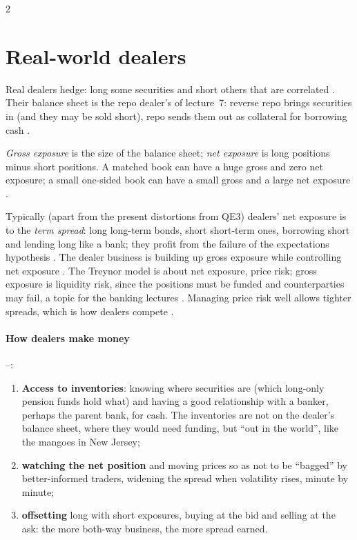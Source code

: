 \begin{paracol}{2}
\section{Real-world dealers}\label{sec:dl-real}

Real dealers hedge: long some securities and short others that are correlated . Their balance sheet is the repo dealer's of lecture~7: reverse repo brings securities in (and
they may be sold short), repo sends them out as collateral for borrowing cash .

\begin{definition}
\emph{Gross exposure} is the size of the balance sheet; \emph{net exposure} is long positions minus short positions. A matched book can have a huge gross and zero net exposure; a small
one-sided book can have a small gross and a large net exposure .
\end{definition}

Typically (apart from the present distortions from QE3) dealers' net exposure is to the \emph{term spread}: long long-term bonds, short short-term ones, borrowing short and lending long
like a bank; they profit from the failure of the expectations hypothesis . The dealer business is building up gross exposure while controlling
net exposure . The Treynor model is about net exposure, price risk; gross exposure is liquidity risk, since the positions must be funded and counterparties may fail, a topic
for the banking lectures . Managing price risk well allows tighter spreads, which is how dealers compete .

\paragraph{How dealers make money} --:
\begin{enumerate}
  \item \textbf{Access to inventories}: knowing where securities are (which long-only pension funds hold what) and having a good relationship with a banker, perhaps the parent bank, for
        cash. The inventories are not on the dealer's balance sheet, where they would need funding, but ``out in the world'', like the mangoes in New Jersey;
  \item \textbf{watching the net position} and moving prices so as not to be ``bagged'' by better-informed traders, widening the spread when volatility rises, minute by minute;
  \item \textbf{offsetting} long with short exposures, buying at the bid and selling at the ask: the more both-way business, the more spread earned.
\end{enumerate}


\end{paracol}
